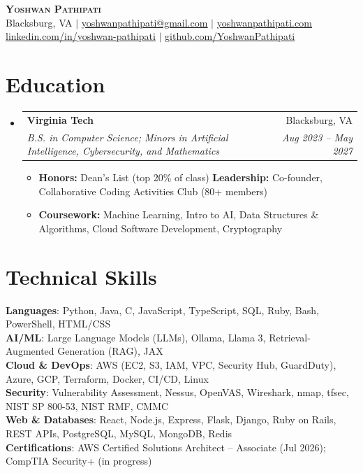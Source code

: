 \documentclass[letterpaper,10pt]{article}
\makeatletter
\newcommand{\resumeItem}[1]{
  \item\small{
    {#1 \vspace{-2pt}}
  }
}
\newcommand{\resumeSubheading}[4]{
  \vspace{-2pt}\item
    \begin{tabular*}{0.97\textwidth}[t]{l@{\extracolsep{\fill}}r}
      \textbf{#1} & #2 \\
      \textit{\small#3} & \textit{\small #4} \\
    \end{tabular*}\vspace{-7pt}
}
\newcommand{\resumeSubHeadingListStart}{\begin{itemize}[leftmargin=0.15in, label={}]}
\newcommand{\resumeSubHeadingListEnd}{\end{itemize}}
\newcommand{\resumeItemListStart}{\begin{itemize}[itemsep=1pt, topsep=2pt]}
\newcommand{\resumeItemListEnd}{\end{itemize}\vspace{-5pt}}
\makeatother
\begin{document}
\begin{center}
    \textbf{\Huge \scshape Yoshwan Pathipati} \\ \vspace{1pt}
    \small Blacksburg, VA $|$
    \href{mailto:yoshwanpathipati@gmail.com}{\underline{yoshwanpathipati@gmail.com}} $|$
    \href{https://yoshwanpathipati.com}{\underline{yoshwanpathipati.com}} \\
    \href{https://www.linkedin.com/in/yoshwan-pathipati}{\underline{linkedin.com/in/yoshwan-pathipati}} $|$
    \href{https://github.com/YoshwanPathipati}{\underline{github.com/YoshwanPathipati}}
\end{center}


\section{Education}
  \resumeSubHeadingListStart
    \resumeSubheading
      {Virginia Tech}{Blacksburg, VA}
      {B.S. in Computer Science; Minors in Artificial Intelligence, Cybersecurity, and Mathematics}{Aug 2023 -- May 2027}
      \resumeItemListStart
        \resumeItem{\textbf{Honors:} Dean's List (top 20\% of class) \quad \textbf{Leadership:} Co-founder, Collaborative Coding Activities Club (80+ members)}
        \resumeItem{\textbf{Coursework:} Machine Learning, Intro to AI, Data Structures \& Algorithms, Cloud Software Development, Cryptography}
      \resumeItemListEnd
  \resumeSubHeadingListEnd


\section{Technical Skills}
 \begin{itemize}[leftmargin=0.15in, label={}]
    \small{\item{
     \textbf{Languages}{: Python, Java, C, JavaScript, TypeScript, SQL, Ruby, Bash, PowerShell, HTML/CSS} \\
     \textbf{AI/ML}{: Large Language Models (LLMs), Ollama, Llama 3, Retrieval-Augmented Generation (RAG), JAX} \\
     \textbf{Cloud \& DevOps}{: AWS (EC2, S3, IAM, VPC, Security Hub, GuardDuty), Azure, GCP, Terraform, Docker, CI/CD, Linux} \\
     \textbf{Security}{: Vulnerability Assessment, Nessus, OpenVAS, Wireshark, nmap, tfsec, NIST SP 800-53, NIST RMF, CMMC} \\
     \textbf{Web \& Databases}{: React, Node.js, Express, Flask, Django, Ruby on Rails, REST APIs, PostgreSQL, MySQL, MongoDB, Redis} \\
     \textbf{Certifications}{: AWS Certified Solutions Architect -- Associate (Jul 2026); CompTIA Security+ (in progress)}
    }}
 \end{itemize}
\end{document}
